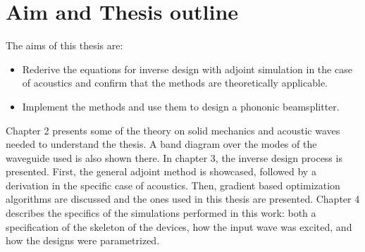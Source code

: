 \section{Aim and Thesis outline}

The aims of this thesis are:
\begin{itemize}
	\item Rederive the equations for inverse design with adjoint simulation in
		the case of acoustics and confirm that the methods are theoretically
		applicable.
	\item Implement the methods and use them to design a phononic beamsplitter.
\end{itemize}

Chapter 2 presents some of the theory on solid mechanics and acoustic waves needed to
understand the thesis.
A band diagram over the modes of the waveguide used is also shown there.
In chapter 3, the inverse design process is presented. First, the general
adjoint method is showcased, followed by a derivation in the specific case of
acoustics.
Then, gradient based optimization algorithms are discussed and the ones used in
this thesis are presented.
Chapter 4 describes the specifics of the simulations performed in this work:
both a specification of the skeleton of the devices, how the input wave was excited,
and how the designs were parametrized.

